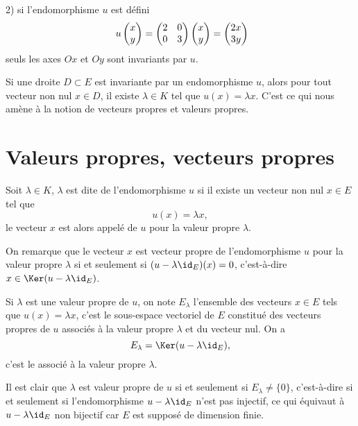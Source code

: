 \documentclass[class=report,crop=false]{standalone}
\begin{document}
2) si l'endomorphisme $u$ est défini $$\ u\left(\begin{matrix}x\cr y\end{matrix}\right)=\left(\begin{matrix}2&0\cr0&3\end{matrix}\right)\left(\begin{matrix}x\cr y\end{matrix}\right)=
\left(\begin{matrix}2x\cr 3y\end{matrix}\right)$$
seuls les axes $Ox$ et $Oy$ sont invariants par $u$.

Si une droite $D\subset E$ est invariante par un endomorphisme $u$, alors pour tout vecteur non nul
 $x\in D$, il existe $\lambda\in K$ tel que $u(x)=\lambda x$. C'est ce qui nous amène à la notion de vecteurs propres et valeurs propres.

 
\section{Valeurs propres, vecteurs propres}

\begin{definition}
Soit $\lambda\in K$, $\lambda$ est dite  de l'endomorphisme $u$ si il
existe un vecteur non nul $x\in E$ tel que 
$$u(x)=\lambda x,$$
le vecteur $x$ est alors appelé  de $u$ pour la valeur propre $\lambda$.
\end{definition} 
 
On remarque que le vecteur $x$ est vecteur propre 
de l'endomorphisme $u$ pour la valeur propre $\lambda$ 
si et seulement si $(u-\lambda\id_E)(x)=0$, c'est-à-dire $x\in\Ker(u-\lambda\id_E)$.

\begin{definition}
Si $\lambda$ est une valeur propre de $u$, on note $E_\lambda$ 
l'ensemble des vecteurs $x\in E$ tels que $u(x)=\lambda x$, 
c'est le sous-espace vectoriel de $E$ constitué des vecteurs propres 
de $u$ associés à la valeur propre $\lambda$ et du vecteur nul.
On a
$$E_\lambda =\Ker(u-\lambda\id_E),$$
c'est le  associé à la valeur propre $\lambda$.
\end{definition} 

Il est clair que $\lambda$ est valeur propre de $u$ 
si et seulement si $E_\lambda\neq\{0\}$, c'est-à-dire si et 
seulement si l'endomorphisme $u-\lambda\id_E$ n'est pas injectif, 
ce qui équivaut à $u-\lambda\id_E$
non bijectif car $E$ est supposé de dimension finie.
\end{document}
